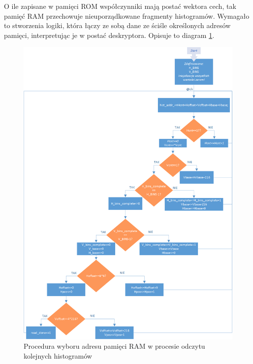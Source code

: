 O ile zapisane w pamięci ROM współczynniki mają postać wektora cech, tak pamięć RAM przechowuje nieuporządkowane fragmenty histogramów. 
Wymagało to stworzenia logiki, która łączy ze sobą dane ze ściśle określonych adresów pamięci, interpretując je w postać deskryptora.  
Opisuje to diagram \ref{fig:hog_feature_histrogram_address}. %

\begin{figure}[h!]
	\centering
	\captionsetup{justification=centering,margin=1cm}
	\includegraphics[width=15cm]{4_HOG_Features.png}
	\caption{Procedura wyboru adresu pamięci RAM w procesie odczytu kolejnych histogramów}
	\label{fig:hog_feature_histrogram_address}
\end{figure} 


